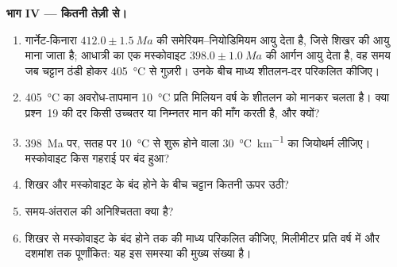 \begin{problem}
\noindent\textbf{भाग IV --- कितनी तेज़ी से।}
\begin{enumerate}[resume]
\item गार्नेट-किनारा $412.0 \pm \qty{1.5}{Ma}$ की समेरियम--नियोडिमियम आयु देता है, जिसे
शिखर की आयु माना जाता है; आधात्री का एक मस्कोवाइट $398.0 \pm
\qty{1.0}{Ma}$ की आर्गन आयु देता है, वह समय जब चट्टान ठंडी होकर \qty{405}{\celsius} से गुज़री। उनके बीच
माध्य शीतलन-दर परिकलित कीजिए।
\item \qty{405}{\celsius} का अवरोध-तापमान
\qty{10}{\celsius} प्रति मिलियन वर्ष के शीतलन को मानकर चलता है। क्या प्रश्न~19 की दर किसी उच्चतर या
निम्नतर मान की माँग करती है, और क्यों?
\item \qty{398}{Ma} पर, सतह पर \qty{10}{\celsius} से शुरू होने वाला \qty{30}{\celsius\per\km} का जियोथर्म
लीजिए। मस्कोवाइट किस गहराई पर बंद हुआ?
\item शिखर और मस्कोवाइट के बंद होने के बीच चट्टान कितनी ऊपर उठी?
\item समय-अंतराल की अनिश्चितता क्या है?
\item शिखर से मस्कोवाइट के बंद होने तक की माध्य  परिकलित कीजिए,
मिलीमीटर प्रति वर्ष में और दशमांश तक पूर्णांकित: यह इस समस्या की मुख्य संख्या है।
\end{enumerate}
\end{problem}
